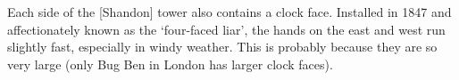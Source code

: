 
\epigraph{\onehalfspacing
  Each side of the [Shandon] tower also contains a clock face. Installed in 1847 and affectionately known as the
  `four-faced liar', the hands on the east and west run slightly fast, especially in windy weather.
  This is probably because they are so very large
  (only Bug Ben in London has larger clock faces).
}{
  \cite{CorkStrolls}
}
